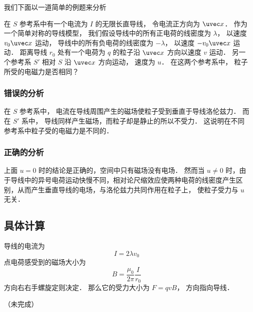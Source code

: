 
\begin{issues}
\issueDraft
\end{issues}



我们下面以一道简单的例题来分析

在 $S$ 参考系中有一个电流为 $I$ 的无限长直导线， 令电流正方向为 $\uvec x$． 作为一个简单对称的导线模型， 我们假设导线中的所有正电荷的线密度为 $\lambda$， 以速度 $v_0\uvec x$ 运动， 导线中的所有负电荷的线密度为 $-\lambda$，  以速度 $-v_0\uvec x$ 运动． 距离导线 $r_0$ 处有一个电荷为 $q$ 的粒子沿 $\uvec x$ 方向以速度 $v$ 运动． 另一个参考系 $S'$ 相对 $S$ 沿 $\uvec x$ 方向运动， 速度为 $u$． 在这两个参考系中， 粒子所受的电磁力是否相同？


\subsubsection{错误的分析}
在 $S$ 参考系中， 电流在导线周围产生的磁场使粒子受到垂直于导线洛伦兹力． 而在 $S'$ 系中， 导线同样产生磁场，而粒子却是静止的所以不受力． 这说明在不同参考系中粒子受的电磁力是不同的．

\subsubsection{正确的分析}
上面 $u = 0$ 时的结论是正确的，空间中只有磁场没有电场． 然而当 $u \ne 0$ 时，由于导线中的异号电荷运动快慢不同，相对论尺缩效应使两种电荷的线密度产生区别，从而产生垂直导线的电场，与洛伦兹力共同作用在粒子上， 使粒子受力与 $u$ 无关．

\subsection{具体计算}
导线的电流为
\begin{equation}
I = 2\lambda v_0
\end{equation}
点电荷感受到的磁场大小为
\begin{equation}
B = \frac{\mu_0}{2\pi} \frac{I}{r_0}
\end{equation}
方向右右手螺旋定则决定． 那么它的受力大小为 $F = q v B$， 方向指向导线．



（未完成）
